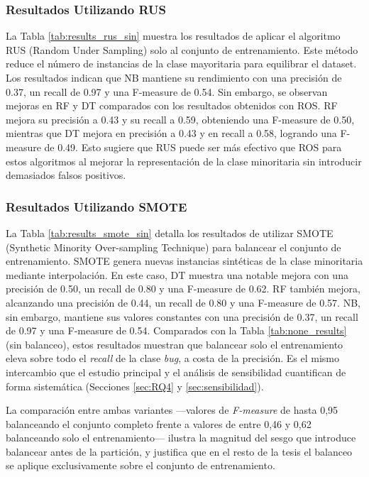 

\subsubsection{Resultados Utilizando RUS}
La Tabla \ref{tab:results_rus_sin} muestra los resultados de aplicar el algoritmo RUS (Random Under Sampling) solo al conjunto de entrenamiento. Este método reduce el número de instancias de la clase mayoritaria para equilibrar el dataset. Los resultados indican que NB mantiene su rendimiento con una precisión de 0.37, un recall de 0.97 y una F-measure de 0.54. Sin embargo, se observan mejoras en RF y DT comparados con los resultados obtenidos con ROS. RF mejora su precisión a 0.43 y su recall a 0.59, obteniendo una F-measure de 0.50, mientras que DT mejora en precisión a 0.43 y en recall a 0.58, logrando una F-measure de 0.49. Esto sugiere que RUS puede ser más efectivo que ROS para estos algoritmos al mejorar la representación de la clase minoritaria sin introducir demasiados falsos positivos.






\subsubsection{Resultados Utilizando SMOTE}

La Tabla \ref{tab:results_smote_sin} detalla los resultados de utilizar SMOTE (Synthetic Minority Over-sampling Technique) para balancear el conjunto de entrenamiento. SMOTE genera nuevas instancias sintéticas de la clase minoritaria mediante interpolación. En este caso, DT muestra una notable mejora con una precisión de 0.50, un recall de 0.80 y una F-measure de 0.62. RF también mejora, alcanzando una precisión de 0.44, un recall de 0.80 y una F-measure de 0.57. NB, sin embargo, mantiene sus valores constantes con una precisión de 0.37, un recall de 0.97 y una F-measure de 0.54. Comparados con la Tabla \ref{tab:none_results} (sin balanceo), estos resultados muestran que balancear solo el entrenamiento eleva sobre todo el \textit{recall} de la clase \textit{bug}, a costa de la precisión. Es el mismo intercambio que el estudio principal y el análisis de sensibilidad cuantifican de forma sistemática (Secciones \ref{sec:RQ4} y \ref{sec:sensibilidad}).

La comparación entre ambas variantes ---valores de \textit{F-measure} de hasta 0,95 balanceando el conjunto completo frente a valores de entre 0,46 y 0,62 balanceando solo el entrenamiento--- ilustra la magnitud del sesgo que introduce balancear antes de la partición, y justifica que en el resto de la tesis el balanceo se aplique exclusivamente sobre el conjunto de entrenamiento.




